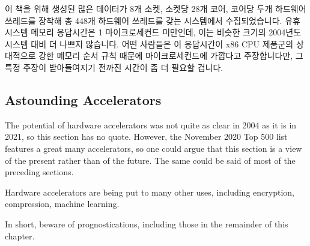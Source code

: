 이 책을 위해 생성된 많은 데이터가 8개 소켓, 소켓당 28개 코어, 코어당 두개
하드웨어 쓰레드를 장착해 총 448개 하드웨어 쓰레드를 갖는 시스템에서
수집되었습니다.
유휴 시스템 메모리 응답시간은 1 마이크로세컨드 미만인데, 이는 비슷한 크기의
2004년도 시스템 대비 더 나쁘지 않습니다.
어떤 사람들은 이 응답시간이 x86 CPU 제품군의 상대적으로 강한 메모리 순서 규칙
때문에 마이크로세컨드에 가깝다고 주장합니다만, 그 특정 주장이 받아들여지기
전까진 시간이 좀 더 필요할 겁니다.

\subsection{Astounding Accelerators}
\label{sec:future:Astounding Accelerators}

The potential of hardware accelerators was not quite as clear in 2004
as it is in 2021, so this section has no quote.
However, the November 2020 Top 500 list~\cite{Top500} features a great
many accelerators, so one could argue that this section is a view of
the present rather than of the future.
The same could be said of most of the preceding sections.

Hardware accelerators are being put to many other uses, including
encryption, compression, machine learning.

In short, beware of prognostications, including those in the remainder
of this chapter.
